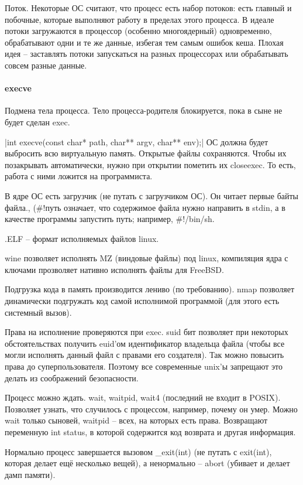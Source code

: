 \documentclass[a4paper,10pt]{article}
\begin{document}
Поток.
Некоторые ОС считают, что процесс есть набор потоков: есть главный и побочные, которые выполняют работу в пределах этого процесса. В идеале потоки загружаются в процессор (особенно многоядерный) одновременно, обрабатывают одни и те же данные, избегая тем самым ошибок кеша. Плохая идея -- заставлять потоки запускаться на разных процессорах или обрабатывать совсем разные данные.

\paragraph{execve}
Подмена тела процесса. Тело процесса-родителя блокируется, пока в сыне не будет сделан exec. 

|int execve(const char* path, char** argv, char** env);|
ОС должна будет выбросить всю виртуальную память.
Открытые файлы сохраняются. Чтобы их позакрывать автоматически, нужно при открытии пометить их closeexec. То есть, работа с ними ложится на программиста.

В ядре ОС есть загрузчик (не путать с загрузчиком ОС). Он читает первые байты файла.,
(\#!путь означает, что содержимое файла нужно направить в stdin, а в качестве программы запустить путь; например, \#!/bin/sh.

.ELF -- формат исполняемых файлов linux.

wine позволяет исполнять MZ (виндовые файлы) под linux, компиляция ядра с ключами прозволяет нативно исполнять файлы для FreeBSD. 

Подгрузка кода в память производится лениво (по требованию). nmap позволяет динамически подгружать код самой исполнимой программой (для этого есть системный вызов). 

Права на исполнение проверяются при exec. suid бит позволяет при некоторых обстоятельствах получить euid'ом идентификатор владельца файла (чтобы все могли исполнять данный файл с правами его создателя). Так можно повысить права до суперпользователя. Поэтому все современные unix'ы запрещают это делать из соображений безопасности. 


Процесс можно ждать. wait, waitpid, wait4 (последний не входит в POSIX). Позволяет узнать, что случилось с процессом, например, почему он умер. Можно wait только сыновей, waitpid -- всех, на которых есть права. Возвращают переменную int status, в которой содержится код возврата и другая информация.

Нормально процесс завершается вызовом \_exit(int) (не путать с exit(int), которая делает ещё несколько вещей), а ненормально -- abort (убивает и делает дамп памяти).
\end{document}

